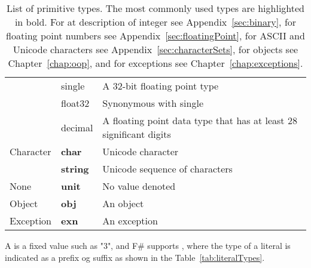 \begin{table}
\begin{tabularx}{\textwidth}{|l|l|>{\raggedright\arraybackslash}X|}
             & single &A 32-bit floating point type\\
             & float32 &Synonymous with single\\
             & decimal &A floating point data type that has at least 28 significant digits\\
    \hline
    Character &\textbf{char} &Unicode character\\
             &\textbf{string} & Unicode sequence of characters\\
    \hline
    None &\textbf{unit} & No value denoted\\
    \hline
    Object &\textbf{obj} & An object\\
    \hline
    Exception &\textbf{exn} & An exception\\
    \hline
  \end{tabularx}
  \caption{List of primitive types. The most commonly used types are highlighted in bold. For at description of integer see Appendix~\ref{sec:binary}, for floating point numbers see Appendix~\ref{sec:floatingPoint}, for ASCII and Unicode characters see Appendix~\ref{sec:characterSets}, for objects see Chapter~\ref{chap:oop}, and for exceptions see Chapter~\ref{chap:exceptions}.}
  \label{tab:primitiveTypes}
\end{table}
A  is a fixed value such as "3", and F\# supports , where the type of a literal is indicated as a prefix og suffix as shown in the Table~\ref{tab:literalTypes}.

